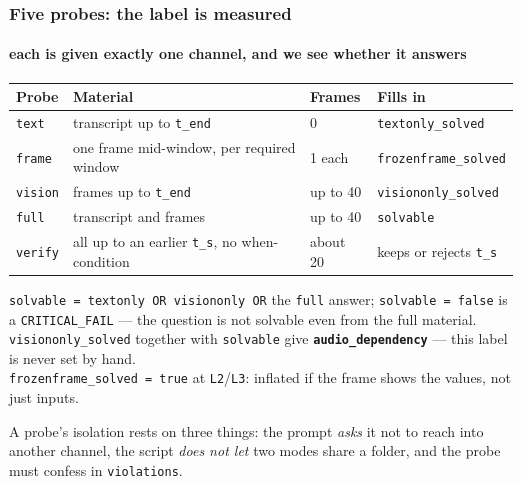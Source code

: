 \documentclass[aspectratio=169,10pt]{beamer}
\newcommand{\lead}[1]{{\color{warm}\textbf{#1}}}
\begin{document}
\begin{frame}
  \frametitle{Five probes: the label is measured}
  \framesubtitle{each is given exactly one channel, and we see whether it answers}

  \begin{center}
  \small
  \begin{tabular}{@{}llll@{}}
    \toprule
    \textbf{Probe} & \textbf{Material} & \textbf{Frames} & \textbf{Fills in} \\
    \midrule
    \texttt{text}   & transcript up to \texttt{t\_end}            & 0          & \texttt{textonly\_solved} \\
    \texttt{frame}  & one frame mid-window, per required window   & 1 each     & \texttt{frozenframe\_solved} \\
    \texttt{vision} & frames up to \texttt{t\_end}                & up to 40   & \texttt{visiononly\_solved} \\
    \texttt{full}   & transcript and frames                       & up to 40   & \texttt{solvable} \\
    \texttt{verify} & all up to an earlier \texttt{t\_s}, no when-condition & about 20 & keeps or rejects \texttt{t\_s} \\
    \bottomrule
  \end{tabular}
  \end{center}

  \vspace{0.3em}
  {\small
  \texttt{solvable = textonly OR visiononly OR} the \texttt{full} answer; \texttt{solvable = false}
  is a \texttt{CRITICAL\_FAIL} — the question is not solvable even from the full material.\\[0.3em]
  \texttt{visiononly\_solved} together with \texttt{solvable} give \lead{\texttt{audio\_dependency}}
  — this label is never set by hand.\\[0.3em]
  \texttt{frozenframe\_solved = true} at \texttt{L2}/\texttt{L3}: inflated if the frame shows the values, not just inputs.}

  \vspace{0.5em}
  {\color{muted}\small A probe's isolation rests on three things: the prompt \emph{asks} it not to reach into
  another channel, the script \emph{does not let} two modes share a folder, and the probe must
  confess in \texttt{violations}.}
\end{frame}
\end{document}
